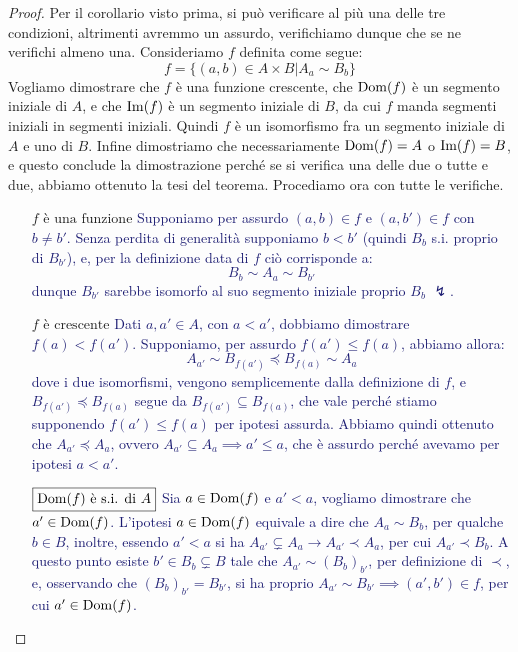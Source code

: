 \begin{proof}
	Per il corollario visto prima, si può verificare al più una delle tre condizioni, altrimenti avremmo un assurdo, verifichiamo dunque che se ne verifichi almeno una. Consideriamo $f$ definita come segue:
	\[ f = \{(a,b) \in A \times B | A_a \sim B_b\}
		\]
	Vogliamo dimostrare che $f$ è una funzione crescente, che $\operatorname{Dom}(f)$ è un segmento iniziale di $A$, e che $\operatorname{Im}(f)$ è un segmento iniziale di $B$, da cui $f$ manda segmenti iniziali in segmenti iniziali. Quindi $f$ è un isomorfismo fra un segmento iniziale di $A$ e uno di $B$.
	Infine dimostriamo che necessariamente $\operatorname{Dom}(f) = A$ o $\operatorname{Im}(f) = B$, e questo conclude la dimostrazione perché se si verifica una delle due o tutte e due, abbiamo ottenuto la tesi del teorema. Procediamo ora con tutte le verifiche.
	\begin{itemize}
		\item[$\boxed{\text{$f$ è una funzione}}$] \textcolor{MidnightBlue}{Supponiamo per assurdo $(a,b) \in f$ e $(a,b') \in f$ con $b \ne b'$. Senza perdita di generalità supponiamo $b < b'$ (quindi $B_b$ s.i. proprio di $B_{b'}$), e, per la definizione data di $f$ ciò corrisponde a:
		\[ B_b \sim A_a \sim B_{b'}
			\]
		dunque $B_{b'}$ sarebbe isomorfo al suo segmento iniziale proprio $B_b$ $\lightning$.}
		\item[$\boxed{\text{$f$ è crescente}}$] \textcolor{MidnightBlue}{Dati $a,a' \in A$, con $a<a'$, dobbiamo dimostrare $f(a) < f(a')$. Supponiamo, per assurdo $f(a') \leq f(a)$, abbiamo allora:
		\[ A_{a'} \sim B_{f(a')} \preceq B_{f(a)} \sim A_a
			\]
		dove i due isomorfismi, vengono semplicemente dalla definizione di $f$, e $B_{f(a')} \preceq B_{f(a)}$ segue da $B_{f(a')} \subseteq B_{f(a)}$, che vale perché stiamo supponendo $f(a') \leq f(a)$ per ipotesi assurda.
		Abbiamo quindi ottenuto che $A_{a'}\preceq A_a$, ovvero $A_{a'}\subseteq A_a \implies a' \leq a$, che è assurdo perché avevamo per ipotesi $a < a'$.}
		\item[$\boxed{\text{$\operatorname{Dom}(f)$ è s.i. di $A$}}$] \textcolor{MidnightBlue}{Sia $a \in \operatorname{Dom}(f)$ e $a' < a$, vogliamo dimostrare che $a' \in \operatorname{Dom}(f)$. L'ipotesi $a \in \operatorname{Dom}(f)$ equivale a dire che $A_a \sim B_b$, per qualche $b \in B$,
		inoltre, essendo $a' < a$ si ha $A_{a'} \subsetneq A_a \to A_{a'} \prec A_a$, per cui $A_{a'} \prec B_b$. A questo punto esiste $b' \in B_b \subsetneq B$ tale che $A_{a'} \sim (B_{b})_{b'}$, per definizione di $\prec$, e, osservando che $(B_b)_{b'} = B_{b'}$,
		si ha proprio $A_{a'} \sim B_{b'} \implies (a',b') \in f$, per cui $a' \in \operatorname{Dom}(f)$.}

\end{itemize}
\end{proof}
